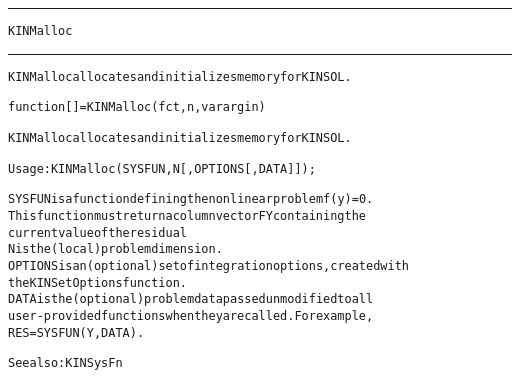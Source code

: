 \begin{samepage}
\hrule
\begin{center}
{\large \verb!KINMalloc!}
\label{p:KINMalloc}
\end{center}
\hrule\vspace{0.1in}



\begin{alltt}
KINMalloc allocates and initializes memory for KINSOL.
\end{alltt}

\end{samepage}



\begin{samepage}


\begin{alltt}
function [] = KINMalloc(fct,n,varargin) 
\end{alltt}

\end{samepage}



\begin{alltt}
KINMalloc allocates and initializes memory for KINSOL.

   Usage:   KINMalloc ( SYSFUN, N [, OPTIONS [, DATA] ] );

   SYSFUN   is a function defining the nonlinear problem f(y) = 0.
            This function must return a column vector FY containing the
            current value of the residual
   N        is the (local) problem dimension.
   OPTIONS  is an (optional) set of integration options, created with
            the KINSetOptions function. 
   DATA     is the (optional) problem data passed unmodified to all
            user-provided functions when they are called. For example,
            RES = SYSFUN(Y,DATA).

   See also: KINSysFn
\end{alltt}






\vspace{0.1in}